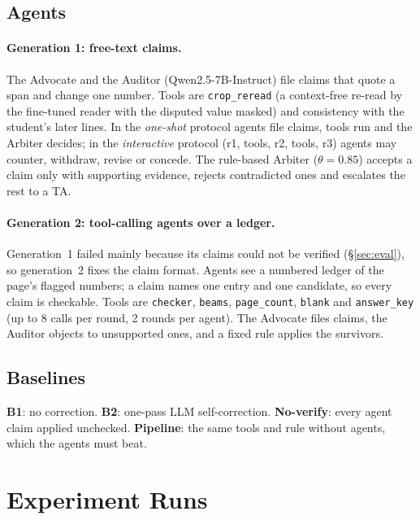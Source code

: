 \documentclass[11pt]{article}
\newcommand{\tool}[1]{\texttt{\small #1}}
\begin{document}
\subsection{Agents}
\paragraph{Generation 1: free-text claims.} The Advocate and the Auditor (Qwen2.5-7B-Instruct) file claims that quote a span and change one number. Tools are \tool{crop\_reread} (a context-free re-read by the fine-tuned reader with the disputed value masked) and consistency with the student's later lines. In the \emph{one-shot} protocol agents file claims, tools run and the Arbiter decides; in the \emph{interactive} protocol (r1, tools, r2, tools, r3) agents may counter, withdraw, revise or concede. The rule-based Arbiter ($\theta=0.85$) accepts a claim only with supporting evidence, rejects contradicted ones and escalates the rest to a TA.

\paragraph{Generation 2: tool-calling agents over a ledger.} Generation~1 failed mainly because its claims could not be verified (\S\ref{sec:eval}), so generation~2 fixes the claim format. Agents see a numbered ledger of the page's flagged numbers; a claim names one entry and one candidate, so every claim is checkable. Tools are \tool{checker}, \tool{beams}, \tool{page\_count}, \tool{blank} and \tool{answer\_key} (up to 8 calls per round, 2 rounds per agent). The Advocate files claims, the Auditor objects to unsupported ones, and a fixed rule applies the survivors.

\subsection{Baselines}
\textbf{B1}: no correction. \textbf{B2}: one-pass LLM self-correction. \textbf{No-verify}: every agent claim applied unchecked. \textbf{Pipeline}: the same tools and rule without agents, which the agents must beat.

\section{Experiment Runs}
\end{document}
